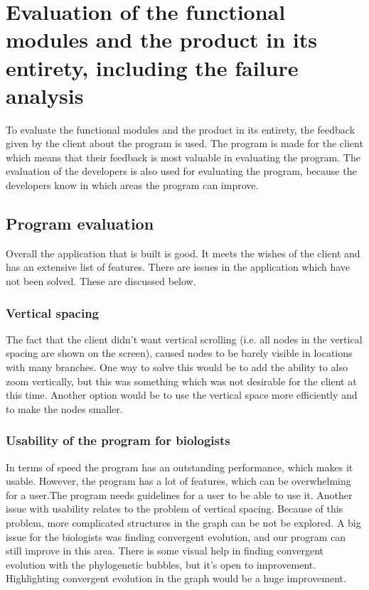 \chapter{Evaluation of the functional modules and the product in its entirety, including the failure analysis}
To evaluate the functional modules and the product in its entirety, the feedback given by the client about the program is used. The program is made for the client which means that their feedback is most valuable in evaluating the program. The evaluation of the developers is also used for evaluating the program, because the developers know in which areas the program can improve. 

\section{Program evaluation}
Overall the application that is built is good. It meets the wishes of the client and has an extensive list of features. There are issues in the application which have not been solved. These are discussed below.
\subsection{Vertical spacing}
The fact that the client didn’t want vertical scrolling (i.e. all nodes in the vertical spacing are shown on the screen), caused nodes to be barely visible in locations with many branches. One way to solve this would be to add the ability to also zoom vertically, but this was something which was not desirable for the client at this time. Another option would be to use the vertical space more efficiently and to make the nodes smaller.

\subsection{Usability of the program for biologists}
In terms of speed the program has an outstanding performance, which makes it usable. However, the program has a lot of features, which can be overwhelming for a user.The program needs guidelines for a user to be able to use it. 
Another issue with usability relates to the problem of vertical spacing. Because of this problem, more complicated structures in the graph can be not be explored. 
A big issue for the biologists was finding convergent evolution, and our program can still improve in this area. There is some visual help in finding convergent evolution with the phylogenetic bubbles, but it’s open to improvement.  Highlighting convergent evolution in the graph would be a huge improvement. 

